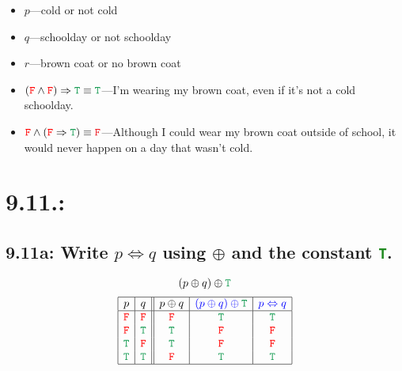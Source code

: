 \documentclass{article}
\begin{document}
\begin{itemize}
\item $p$---cold or not cold
\item $q$---schoolday or not schoolday
\item $r$---brown coat or no brown coat
\item $(\textcolor{red}{\tt{F}}\land\textcolor{red}{\tt{F}})\Rightarrow\textcolor{ForestGreen}{\tt{T}}\equiv\textcolor{ForestGreen}{\tt{T}}$---I'm wearing my brown coat, even if it's not a cold schoolday.
\item $\textcolor{red}{\tt{F}}\land(\textcolor{red}{\tt{F}}\Rightarrow\textcolor{ForestGreen}{\tt{T}})\equiv\textcolor{Red}{\tt{F}}$---Although I could wear my brown coat outside of school, it would never happen on a day that wasn't cold.
\end{itemize}
\section*{9.11.:}
\subsection*{9.11a: Write $p\Leftrightarrow q$ using $\oplus$ and the constant \textcolor{ForestGreen}{\tt{T}}.}
\[(p\oplus q)\oplus\textcolor{ForestGreen}{\tt{T}}\]
\[\begin{array}{|c|c||c|c|c|}
\hline
p&q&p\oplus q&\textcolor{blue}{(p\oplus q)\oplus\textcolor{ForestGreen}{\tt{T}}}&\textcolor{blue}{p\Leftrightarrow q}\\
\hline
\textcolor{red}{\tt{F}}&\textcolor{red}{\tt{F}}&\textcolor{red}{\tt{F}}&\textcolor{ForestGreen}{\tt{T}}&\textcolor{ForestGreen}{\tt{T}}\\
\textcolor{red}{\tt{F}}&\textcolor{ForestGreen}{\tt{T}}&\textcolor{ForestGreen}{\tt{T}}&\textcolor{red}{\tt{F}}&\textcolor{red}{\tt{F}}\\
\textcolor{ForestGreen}{\tt{T}}&\textcolor{red}{\tt{F}}&\textcolor{ForestGreen}{\tt{T}}&\textcolor{red}{\tt{F}}&\textcolor{red}{\tt{F}}\\
\textcolor{ForestGreen}{\tt{T}}&\textcolor{ForestGreen}{\tt{T}}&\textcolor{red}{\tt{F}}&\textcolor{ForestGreen}{\tt{T}}&\textcolor{ForestGreen}{\tt{T}}\\
\hline
\end{array}\]
\end{document}
